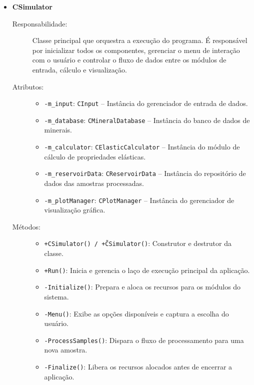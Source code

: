\begin{itemize}
    \item \textbf{CSimulator}
    \begin{description}
        \item[Responsabilidade:] Classe principal que orquestra a execução do programa. É responsável por inicializar todos os componentes, gerenciar o menu de interação com o usuário e controlar o fluxo de dados entre os módulos de entrada, cálculo e visualização.
        
        \item[Atributos:] 
        \begin{itemize}
            \item \texttt{-m\_input}: \texttt{CInput} – Instância do gerenciador de entrada de dados.
            \item \texttt{-m\_database}: \texttt{CMineralDatabase} – Instância do banco de dados de minerais.
            \item \texttt{-m\_calculator}: \texttt{CElasticCalculator} – Instância do módulo de cálculo de propriedades elásticas.
            \item \texttt{-m\_reservoirData}: \texttt{CReservoirData} – Instância do repositório de dados das amostras processadas.
            \item \texttt{-m\_plotManager}: \texttt{CPlotManager} – Instância do gerenciador de visualização gráfica.
        \end{itemize}
        
        \item[Métodos:]
        \begin{itemize}
            \item \texttt{+CSimulator() / +\~CSimulator()}: Construtor e destrutor da classe.
            \item \texttt{+Run()}: Inicia e gerencia o laço de execução principal da aplicação.
            \item \texttt{-Initialize()}: Prepara e aloca os recursos para os módulos do sistema.
            \item \texttt{-Menu()}: Exibe as opções disponíveis e captura a escolha do usuário.
            \item \texttt{-ProcessSamples()}: Dispara o fluxo de processamento para uma nova amostra.
            \item \texttt{-Finalize()}: Libera os recursos alocados antes de encerrar a aplicação.
        \end{itemize}
    \end{description}


\end{itemize}
